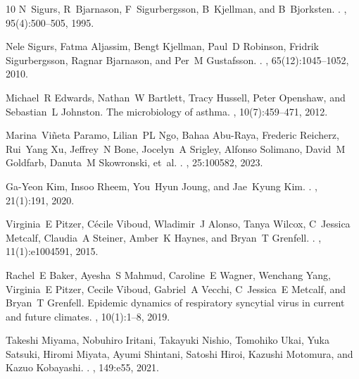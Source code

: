 \documentclass[12pt]{article}
\begin{document}
\begin{thebibliography}{10}
N~Sigurs, R~Bjarnason, F~Sigurbergsson, B~Kjellman, and B~Bjorksten.
.
, 95(4):500--505, 1995.

Nele Sigurs, Fatma Aljassim, Bengt Kjellman, Paul~D Robinson, Fridrik Sigurbergsson, Ragnar Bjarnason, and Per~M Gustafsson.
.
, 65(12):1045--1052, 2010.

Michael~R Edwards, Nathan~W Bartlett, Tracy Hussell, Peter Openshaw, and Sebastian~L Johnston.
\newblock The microbiology of asthma.
, 10(7):459--471, 2012.

Marina~Vi{\~n}eta Paramo, Lilian~PL Ngo, Bahaa Abu-Raya, Frederic Reicherz, Rui~Yang Xu, Jeffrey~N Bone, Jocelyn~A Srigley, Alfonso Solimano, David~M Goldfarb, Danuta~M Skowronski, et~al.
.
, 25:100582, 2023.

Ga-Yeon Kim, Insoo Rheem, You~Hyun Joung, and Jae~Kyung Kim.
.
, 21(1):191, 2020.

Virginia~E Pitzer, C{\'e}cile Viboud, Wladimir~J Alonso, Tanya Wilcox, C~Jessica Metcalf, Claudia~A Steiner, Amber~K Haynes, and Bryan~T Grenfell.
.
, 11(1):e1004591, 2015.

Rachel~E Baker, Ayesha~S Mahmud, Caroline~E Wagner, Wenchang Yang, Virginia~E Pitzer, Cecile Viboud, Gabriel~A Vecchi, C~Jessica~E Metcalf, and Bryan~T Grenfell.
\newblock Epidemic dynamics of respiratory syncytial virus in current and future climates.
, 10(1):1--8, 2019.

Takeshi Miyama, Nobuhiro Iritani, Takayuki Nishio, Tomohiko Ukai, Yuka Satsuki, Hiromi Miyata, Ayumi Shintani, Satoshi Hiroi, Kazushi Motomura, and Kazuo Kobayashi.
.
, 149:e55, 2021.


\end{thebibliography}
\end{document}
